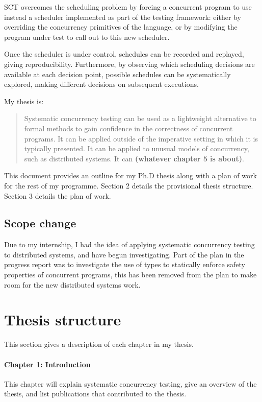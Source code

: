 \documentclass{article}
\begin{document}
SCT overcomes the scheduling problem by forcing a concurrent program
to use instead a scheduler implemented as part of the testing
framework: either by overriding the concurrency primitives of the
language, or by modifying the program under test to call out to this
new scheduler.

Once the scheduler is under control, schedules can be recorded and
replayed, giving reproducibility. Furthermore, by observing which
scheduling decisions are available at each decision point, possible
schedules can be systematically explored, making different decisions
on subsequent executions.

My thesis is:

\begin{quote}
  Systematic concurrency testing can be used as a lightweight
  alternative to formal methods to gain confidence in the correctness
  of concurrent programs. It can be applied outside of the imperative
  setting in which it is typically presented. It can be applied to
  unusual models of concurrency, such as distributed systems. It can
  \textbf{(whatever chapter 5 is about)}.
\end{quote}

This document provides an outline for my Ph.D thesis along with a plan
of work for the rest of my programme. Section 2 details the
provisional thesis structure. Section 3 details the plan of work.

\subsection{Scope change}

Due to my internship, I had the idea of applying systematic
concurrency testing to distributed systems, and have begun
investigating. Part of the plan in the progress report was to
investigate the use of types to statically enforce safety properties
of concurrent programs, this has been removed from the plan to make
room for the new distributed systems work.

\section{Thesis structure}

This section gives a description of each chapter in my thesis.

\paragraph{Chapter 1: Introduction} This chapter will explain
systematic concurrency testing, give an overview of the thesis, and
list publications that contributed to the thesis.
\end{document}
